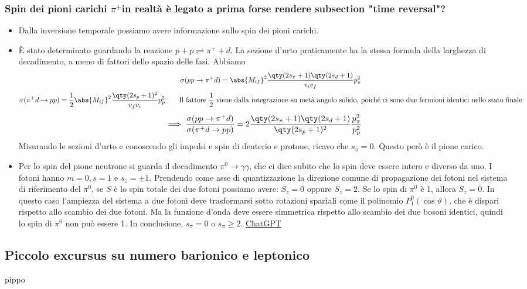 \subsubsection{Spin dei pioni carichi $\pi^\pm$\textbf{in realtà è legato a prima forse rendere subsection "time reversal"?}}
\begin{itemize}
\item Dalla inversione temporale possiamo avere informazione sullo spin dei pioni carichi.
\item È stato determinato guardando la reazione $p+p\rightleftharpoons\pi^++d$. La sezione d'urto praticamente ha la stessa formula della larghezza di decadimento, a meno di fattori dello spazio delle fasi. Abbiamo
\begin{gather*}
\sigma(pp\to\pi^+d)=\abs{M_{if}}^2\frac{\qty(2s_\pi+1)\qty(2s_d+1)}{v_iv_f}p_\pi^2\\
\sigma(\pi^+d\to pp)=\frac12\abs{M_{if}}^2\frac{\qty(2s_p+1)^2}{v_fv_i}p_p^2\qquad\text{Il fattore }\frac12\text{ viene dalla integrazione su metà angolo solido, poiché ci sono due fermioni identici nello stato finale}
\end{gather*}
\begin{equation*}
\implies \frac{\sigma(pp\to\pi^+d)}{\sigma(\pi^+d\to pp)}=2 \frac{\qty(2s_\pi+1)\qty(2s_d+1)}{\qty(2s_p+1)^2}\frac{p_\pi^2}{p_p^2}
\end{equation*}
Misurando le sezioni d'urto e conoscendo gli impulsi e spin di deuterio e protone, ricavo che $s_\pi=0$. Questo però è il pione carico.
\item Per lo spin del pione neutrone si guarda il decadimento $\pi^0\to\gamma\gamma$, che ci dice subito che lo spin deve essere intero e diverso da uno. I fotoni hanno $m=0,s=1$ e $s_z=\pm1$. Prendendo come asse di quantizzazione la direzione comune di propagazione dei fotoni nel sistema di riferimento del $\pi^0$, se \( S \) è lo spin totale dei due fotoni possiamo avere: \( S_z = 0 \) oppure \( S_z = 2 \). Se lo spin di $\pi^0$ è 1, allora \( S_z = 0 \). In questo caso l'ampiezza del sistema a due fotoni deve trasformarsi sotto rotazioni spaziali come il polinomio \( P^0_1(\cos \vartheta) \), che è dispari rispetto allo scambio dei due fotoni. Ma la funzione d'onda deve essere simmetrica rispetto allo scambio dei due bosoni identici, quindi lo spin di $\pi^0$ non può essere 1. In conclusione, \( s_\pi = 0 \) o \( s_\pi \geq 2 \). \href{https://chatgpt.com/c/6734e2f4-81d8-800b-8714-8b28ae3b1bc3}{ChatGPT}
\end{itemize}
\subsection{Piccolo excursus su numero barionico e leptonico}
pippo
